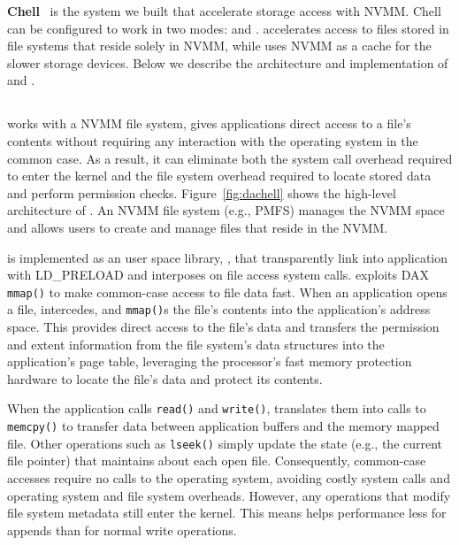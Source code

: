 \textbf{Chell}~\cite{Chell} is the system we built that accelerate storage
access with NVMM. Chell can be configured to work in two modes: \DAChell{}
and \CChell{}. \DAChell{} accelerates access to files stored in file systems
that reside solely in NVMM, while \CChell{} uses NVMM as a cache for the
slower storage devices. Below we describe the architecture and implementation
of \DAChell{} and \CChell{}.

\subsection{\DAChell{}}



\DAChell{} works with a NVMM file system, gives applications direct access to
a file's contents without
requiring any interaction with the operating system in the common case.  As a
result, it can eliminate both the system call overhead required to enter the
kernel and the file system overhead required to locate stored data and perform
permission checks.
Figure~\ref{fig:dachell} shows the high-level architecture of
\DAChell{}. An NVMM file system (e.g.,
PMFS) manages the NVMM space and allows users to create and manage
files that reside in the NVMM.

\DAChell{} is implemented as an user space library, \libd{}, that transparently 
link into application with LD\_PRELOAD and interposes on file access system
calls.
\DAChell{} exploits DAX \texttt{mmap()} to make common-case access to file data
fast.  When an application opens a file, \DAChell{} intercedes, and
\texttt{mmap()}s the file's contents into the application's address space.
This provides direct access to the file's data and transfers the permission and
extent information from the file system's data structures into the
application's page table, leveraging the processor's fast memory
protection hardware to locate the file's data and protect its contents.

When the application calls \texttt{read()} and \texttt{write()}, \DAChell{}
translates them into calls to \texttt{memcpy()} to transfer data between
application buffers and the memory mapped file.  Other operations such as
\texttt{lseek()} simply update the state (e.g., the current file pointer) that
\DAChell{} maintains about each open file.  Consequently, common-case accesses
require no calls to the operating system, avoiding costly system calls and 
operating system and file system overheads. However, any operations that
modify file system metadata still enter the kernel. This means \DAChell{}
helps performance less for appends than for normal write operations.

